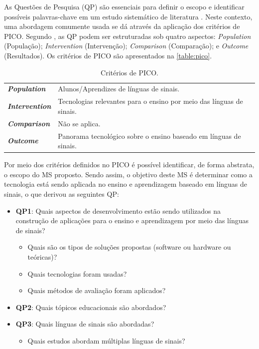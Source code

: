 As Questões de Pesquisa (QP) são essenciais para definir o escopo e identificar possíveis palavras-chave em um estudo sistemático de literatura \cite{Kitchenham2007,Petersen2015}. Neste contexto, uma abordagem comumente usada se dá através da aplicação dos critérios de PICO. Segundo , as QP podem ser estruturadas sob quatro aspectos: \textit{Population} (População); \textit{Intervention} (Intervenção); \textit{Comparison} (Comparação); e \textit{Outcome} (Resultados). Os critérios de PICO são apresentados na \autoref{table:pico}.

\begin{table}[!ht]
\caption{Critérios de PICO.}
\label{table:pico}
\centering
\begin{tabular}{ll}
\toprule
\textbf{\textit{Population}} & Alunos/Aprendizes de línguas de sinais. \\
\textbf{\textit{Intervention}} & Tecnologias relevantes para o ensino por meio das línguas de sinais. \\
\textbf{\textit{Comparison}} & Não se aplica. \\
\textbf{\textit{Outcome}} & Panorama tecnológico sobre o ensino baseado em línguas de sinais. \\ 
\bottomrule
\end{tabular}
\fautor
\end{table}

Por meio dos critérios definidos no PICO é possível identificar, de forma abstrata, o escopo do MS proposto. Sendo assim, o objetivo deste MS é determinar como a tecnologia está sendo aplicada no ensino e aprendizagem baseado em línguas de sinais, o que derivou as seguintes QP:

\begin{itemize}
    \item \textbf{QP1}: Quais aspectos de desenvolvimento estão sendo utilizados na construção de aplicações para o ensino e aprendizagem por meio das línguas de sinais?
    \begin{itemize}
        \item Quais são os tipos de soluções propostas (software ou hardware ou teóricas)?
        \item Quais tecnologias foram usadas?
        \item Quais métodos de avaliação foram aplicados?
    \end{itemize}
    \item \textbf{QP2}: Quais tópicos educacionais são abordados?
    \item \textbf{QP3}: Quais línguas de sinais são abordadas?
    \begin{itemize}
        \item Quais estudos abordam múltiplas línguas de sinais?
    \end{itemize}
\end{itemize}

